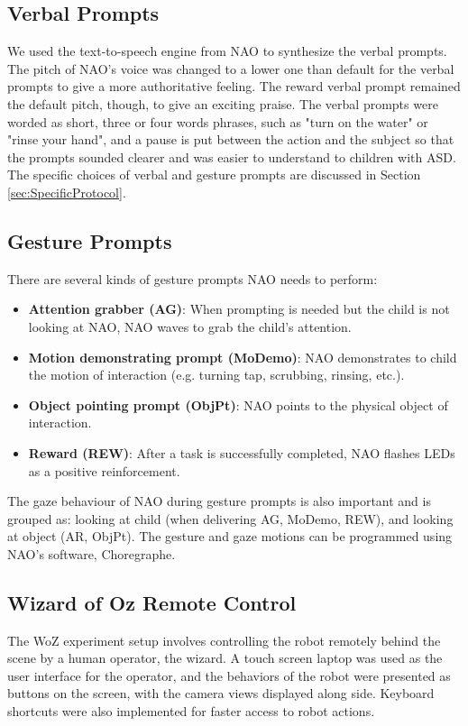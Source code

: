 \documentclass{ut-thesis}
\begin{document}
\subsection{Verbal Prompts}
We used the text-to-speech engine from NAO to synthesize the verbal prompts.  The pitch of NAO's voice was changed to a lower one than default for the verbal prompts to give a more authoritative feeling.  The reward verbal prompt remained the default pitch, though, to give an exciting praise.  The verbal prompts were worded as short, three or four words phrases, such as "turn on the water" or "rinse your hand", and a pause is put between the action and the subject so that the prompts sounded clearer and was easier to understand to children with ASD.  The specific choices of verbal and gesture prompts are discussed in Section \ref{sec:SpecificProtocol}.

\subsection{Gesture Prompts}
There are several kinds of gesture prompts NAO needs to perform:

\begin{itemize}
	\item \textbf{Attention grabber (AG)}:  When prompting is needed but the child is not looking at NAO, NAO waves to grab the child’s attention.
	\item \textbf{Motion demonstrating prompt (MoDemo)}:  NAO demonstrates to child the motion of interaction (e.g. turning tap, scrubbing, rinsing, etc.).
	\item \textbf{Object pointing prompt (ObjPt)}:  NAO points to the physical object of interaction.
	\item \textbf{Reward (REW)}:  After a task is successfully completed, NAO flashes LEDs as a positive reinforcement.
\end{itemize}

The gaze behaviour of NAO during gesture prompts is also important and is grouped as: looking at child (when delivering AG, MoDemo, REW), and looking at object (AR, ObjPt).  The gesture and gaze motions can be programmed using NAO's software, Choregraphe.

\subsection{Wizard of Oz Remote Control}
The WoZ experiment setup involves controlling the robot remotely behind the scene by a human operator, the wizard.  A touch screen laptop was used as the user interface for the operator, and the behaviors of the robot were presented as buttons on the screen, with the camera views displayed along side.  Keyboard shortcuts were also implemented for faster access to robot actions.
\end{document}

